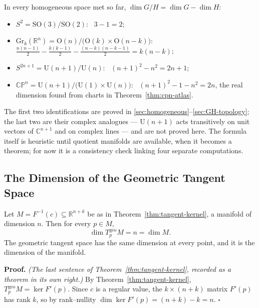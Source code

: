 \documentclass[11pt]{report}
\makeatletter
\newcounter{thmcounter}[section]
\renewenvironment{proof}[1][Proof]{\noindent\textbf{#1.} }{\hfill$\square$\par\vspace{5pt}}
\newcommand{\thmlabel}[1]{\edef\@currentlabel{\arabic{section}.\arabic{thmcounter}}\label{#1}}
\newcommand{\Ogp}{\mathrm{O}}
\newcommand{\SO}{\mathrm{SO}}
\newcommand{\Ugp}{\mathrm{U}}
\newcommand{\Gr}{\mathrm{Gr}}
\newcommand{\geo}{\mathrm{geo}}
\makeatother
\begin{document}
\begin{rembox}\label{rem:dimension-checks-through-homogeneous-spaces}
In every homogeneous space met so far, $\dim G/H = \dim G - \dim H$:
\begin{itemize}
    \item $S^2 = \SO(3)/\SO(2)$: \ $3 - 1 = 2$;
    \item $\Gr_k(\mathbb{R}^n) = \Ogp(n)/\big(\Ogp(k)\times\Ogp(n-k)\big)$: \ $\tfrac{n(n-1)}{2} - \tfrac{k(k-1)}{2} - \tfrac{(n-k)(n-k-1)}{2} = k(n-k)$;
    \item $S^{2n+1} = \Ugp(n+1)/\Ugp(n)$: \ $(n+1)^2 - n^2 = 2n+1$;
    \item $\mathbb{CP}^n = \Ugp(n+1)/\big(\Ugp(1)\times\Ugp(n)\big)$: \ $(n+1)^2 - 1 - n^2 = 2n$, the real dimension found from charts in Theorem~\ref{thm:cpn-atlas}.
\end{itemize}
The first two identifications are proved in \ref{sec:homogeneous}--\ref{sec:GH-topology}; the last two are their complex analogues --- $\Ugp(n+1)$ acts transitively on unit vectors of $\mathbb{C}^{n+1}$ and on complex lines --- and are not proved here. The formula itself is heuristic until quotient manifolds are available, when it becomes a theorem; for now it is a consistency check linking four separate computations.
\end{rembox}

\subsection{The Dimension of the Geometric Tangent Space}\label{sub:geo-dimension}

\begin{thmbox}\thmlabel{thm:geo-tangent-dimension}
Let $M = F^{-1}(c) \subseteq \mathbb{R}^{n+k}$ be as in Theorem~\ref{thm:tangent-kernel}, a manifold of dimension $n$. Then for every $p \in M$,
\[
\dim T^{\geo}_pM = n = \dim M .
\]
The geometric tangent space has the same dimension at every point, and it is the dimension of the manifold.
\end{thmbox}

\begin{proof}
\textit{(The last sentence of Theorem~\ref{thm:tangent-kernel}, recorded as a theorem in its own right.)} By Theorem~\ref{thm:tangent-kernel}, $T^{\geo}_pM = \ker F'(p)$. Since $c$ is a regular value, the $k \times (n+k)$ matrix $F'(p)$ has rank $k$, so by rank--nullity $\dim \ker F'(p) = (n + k) - k = n$.
\end{proof}
\end{document}
